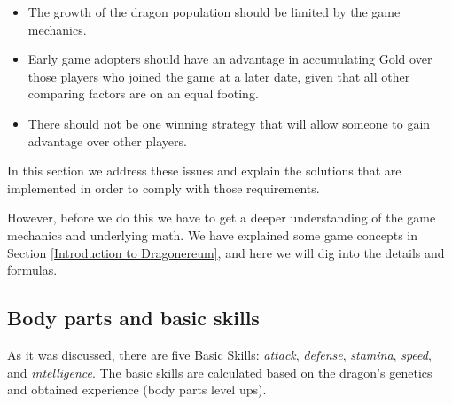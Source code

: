 \documentclass[12pt]{article}
\begin{document}
\begin{itemize}
	\item The growth of the dragon population should be limited by the game mechanics.\par

	\item Early game adopters should have an advantage in accumulating Gold over those players who joined the game at a later date, given that all other comparing factors are on an equal footing.\par

	\item There should not be one winning strategy that will allow someone to gain advantage over other players.
\end{itemize}\par

In this section we address these issues and explain the solutions that are implemented in order to comply with those requirements.\par

However, before we do this we have to get a deeper understanding of the game mechanics and underlying math. We have explained some game concepts in Section \ref{Introduction to Dragonereum}, and here we will dig into the details and formulas.\par

\subsection{Body parts and basic skills}
\label{Body parts and basic skills}  \par

As it was discussed, there are five Basic Skills: \textit{attack}, \textit{defense}, \textit{stamina}, \textit{speed}, and \textit{intelligence}. The basic skills are calculated based on the dragon’s genetics and obtained experience (body parts level ups).\par
\end{document}
